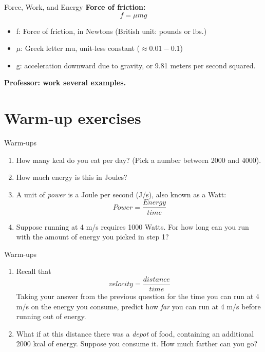 \documentclass{beamer}
\begin{document}
\begin{frame}{Force, Work, and Energy}
\textbf{Force of friction:} 
\begin{equation}
f = \mu m g
\end{equation}
\begin{itemize}
\item f: Force of friction, in Newtons (British unit: pounds or lbs.)
\item $\mu$: Greek letter mu, unit-less constant ($\approx 0.01 - 0.1$)
\item g: acceleration downward due to gravity, or 9.81 meters per second squared.
\end{itemize}
\textbf{Professor: work several examples.}
\end{frame}

\section{Warm-up exercises}

\begin{frame}{Warm-ups}
\begin{enumerate}
\item How many kcal do you eat per day? (Pick a number between 2000 and 4000).
\item How much energy is this in Joules?
\item A unit of \textit{power} is a Joule per second (J/s), also known as a Watt:
\begin{equation}
Power = \frac{Energy}{time}
\end{equation}
\item Suppose running at 4 m/s requires 1000 Watts.  For how long can you run with the amount of energy you picked in step 1?
\end{enumerate}
\end{frame}

\begin{frame}{Warm-ups}
\begin{enumerate}
\item Recall that 
\begin{equation}
velocity = \frac{distance}{time}
\end{equation}
Taking your answer from the previous question for the time you can run at 4 m/s on the energy you consume, predict how \textit{far} you can run at 4 m/s before running out of energy.
\item What if at this distance there was a \textit{depot} of food, containing an additional 2000 kcal of energy.  Suppose you consume it.  How much farther can you go?
\end{enumerate}
\end{frame}
\end{document}
